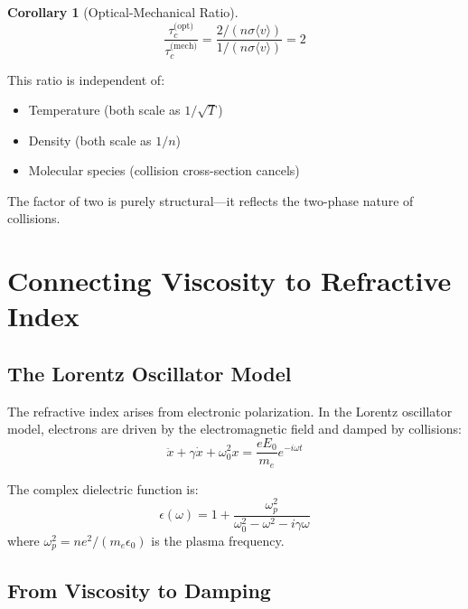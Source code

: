 \documentclass[twocolumn,10pt]{article}
\newtheorem{corollary}[theorem]{Corollary}
\theoremstyle{definition}
\theoremstyle{remark}
\begin{document}
\begin{corollary}[Optical-Mechanical Ratio]
\label{cor:ratio}
\begin{equation}
\frac{\tau_c^{\text{(opt)}}}{\tau_c^{\text{(mech)}}} = \frac{2/(n\sigma\langle v\rangle)}{1/(n\sigma\langle v\rangle)} = 2
\end{equation}
\end{corollary}

This ratio is independent of:
\begin{itemize}
\item Temperature (both scale as $1/\sqrt{T}$)
\item Density (both scale as $1/n$)
\item Molecular species (collision cross-section cancels)
\end{itemize}

The factor of two is purely structural---it reflects the two-phase nature of collisions.

\section{Connecting Viscosity to Refractive Index}
\label{sec:connection}

\subsection{The Lorentz Oscillator Model}

The refractive index arises from electronic polarization. In the Lorentz oscillator model, electrons are driven by the electromagnetic field and damped by collisions:
\begin{equation}
\ddot{x} + \gamma \dot{x} + \omega_0^2 x = \frac{eE_0}{m_e} e^{-i\omega t}
\end{equation}

The complex dielectric function is:
\begin{equation}
\epsilon(\omega) = 1 + \frac{\omega_p^2}{\omega_0^2 - \omega^2 - i\gamma\omega}
\end{equation}
where $\omega_p^2 = ne^2/(m_e\epsilon_0)$ is the plasma frequency.

\subsection{From Viscosity to Damping}
\end{document}
